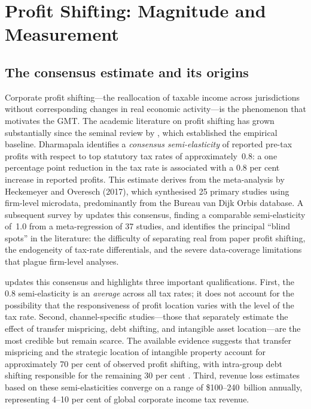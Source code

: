 \documentclass[12pt,a4paper]{article}
\begin{document}
\section{Profit Shifting: Magnitude and Measurement}\label{sec:profitshifting}

\subsection{The consensus estimate and its origins}

Corporate profit shifting---the reallocation of taxable income across jurisdictions without corresponding changes in real economic activity---is the phenomenon that motivates the GMT.
The academic literature on profit shifting has grown substantially since the seminal review by \textcite{dharmapala2014}, which established the empirical baseline.
Dharmapala identifies a \emph{consensus semi-elasticity} of reported pre-tax profits with respect to top statutory tax rates of approximately~0.8: a one percentage point reduction in the tax rate is associated with a 0.8 per cent increase in reported profits.
This estimate derives from the meta-analysis by Heckemeyer and Overesch (2017), which synthesised 25 primary studies using firm-level microdata, predominantly from the Bureau van Dijk Orbis database.
A subsequent survey by \textcite{beer2020} updates this consensus, finding a comparable semi-elasticity of~1.0 from a meta-regression of 37 studies, and identifies the principal ``blind spots'' in the literature: the difficulty of separating real from paper profit shifting, the endogeneity of tax-rate differentials, and the severe data-coverage limitations that plague firm-level analyses.

\textcite{riedel2018} updates this consensus and highlights three important qualifications.
First, the 0.8 semi-elasticity is an \emph{average} across all tax rates; it does not account for the possibility that the responsiveness of profit location varies with the level of the tax rate.
Second, channel-specific studies---those that separately estimate the effect of transfer mispricing, debt shifting, and intangible asset location---are the most credible but remain scarce.
The available evidence suggests that transfer mispricing and the strategic location of intangible property account for approximately 70 per cent of observed profit shifting, with intra-group debt shifting responsible for the remaining 30 per cent \parencite[see also][]{johansson2017}.
Third, revenue loss estimates based on these semi-elasticities converge on a range of \$100--240~billion annually, representing 4--10 per cent of global corporate income tax revenue.
\end{document}
